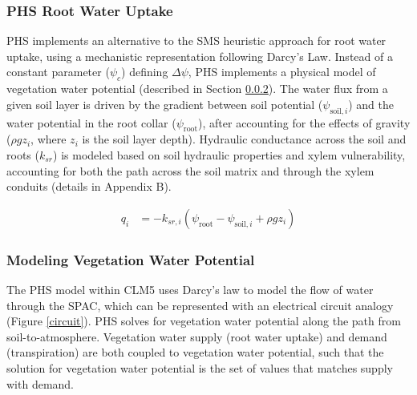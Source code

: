 \documentclass[draft,linenumbers]{agujournal}
\begin{document}
    \subsubsection{PHS Root Water Uptake}
        \label{sect:phsrwu}
    
    PHS implements an alternative to the SMS heuristic approach for root water uptake, using a mechanistic representation following Darcy's Law.
    Instead of a constant parameter ($\psi_c$) defining $\Delta\psi$, PHS implements a physical model of vegetation water potential (described in Section \ref{sect:vwp}).
    The water flux from a given soil layer is driven by the gradient between soil potential ($\psi_{\text{soil},i}$) and the water potential in the root collar ($\psi_{\text{root}}$), 
    after accounting for the effects of gravity ($\rho g z_i$, where $z_i$ is the soil layer depth).
    Hydraulic conductance across the soil and roots ($k_{sr}$) is modeled based on soil hydraulic properties and xylem vulnerability, 
    accounting for both the path across the soil matrix and through the xylem conduits (details in Appendix B).
    
    \begin{linenomath*}
    \begin{equation}
        \begin{aligned}
    q_i &= -k_{sr,i}  \left(\psi_{\text{root}}-\psi_{\text{soil},i}+\rho g z_i\right)
    \label{phs:sink}
    \end{aligned}
    \end{equation}
    \end{linenomath*}

\subsubsection{Modeling Vegetation Water Potential}
\label{sect:vwp}
  The PHS model within CLM5 uses Darcy's law to model the flow of water through the SPAC, which can be represented with an electrical circuit analogy (Figure \ref{circuit}).
  PHS solves for vegetation water potential along the path from soil-to-atmosphere.
  Vegetation water supply (root water uptake) and demand (transpiration) are both coupled to vegetation water potential, 
  such that the solution for vegetation water potential is the set of values that matches supply with demand.
\end{document}
